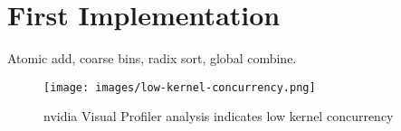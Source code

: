\section{First Implementation}
\label{sec:first impl}

Atomic add, coarse bins, radix sort, global combine.


\begin{figure}[htb]
  \centering
  \texttt{[image: images/low-kernel-concurrency.png]}
  \caption{nvidia Visual Profiler analysis indicates low kernel concurrency}
  \label{fig:first impl}
\end{figure}
